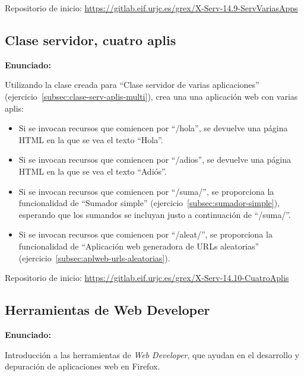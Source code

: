 Repositorio de inicio: \url{https://gitlab.eif.urjc.es/grex/X-Serv-14.9-ServVariasApps}

\subsection{Clase servidor, cuatro aplis}
\label{subsec:clase-serv-aplis-varias}

\textbf{Enunciado:}

Utilizando la clase creada para ``Clase servidor de varias aplicaciones'' (ejercicio~\ref{subsec:clase-serv-aplis-multi}), crea una una aplicación web con varias aplis:

\begin{itemize}
\item Si se invocan recursos que comiencen por ``/hola'', se devuelve una página HTML en la que se vea el texto ``Hola''.
\item Si se invocan recursos que comiencen por ``/adios'', se devuelve una página HTML en la que se vea el texto ``Adiós''.
\item Si se invocan recursos que comiencen por ``/suma/'', se proporciona la funcionalidad de ``Sumador simple'' (ejercicio~\ref{subsec:sumador-simple}), esperando que los sumandos se incluyan justo a continuación de ``/suma/''.
\item Si se invocan recursos que comiencen por ``/aleat/'', se proporciona la funcionalidad de ``Aplicación web generadora de URLs aleatorias'' (ejercicio~\ref{subsec:aplweb-urls-aleatorias}).
\end{itemize}

Repositorio de inicio: \url{https://gitlab.eif.urjc.es/grex/X-Serv-14.10-CuatroAplis}

\subsection{Herramientas de Web Developer}
\label{subsec:inst-web-developer}

\textbf{Enunciado:}

Introducción a las herramientas de \emph{Web Developer}, que ayudan en el desarrollo
y depuración de aplicaciones web en Firefox.

